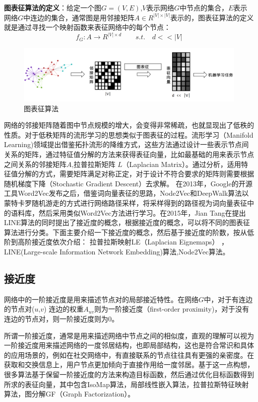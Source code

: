 \textbf{图表征算法的定义}：给定一个图$G = (V,E)$,$V$表示网络$G$中节点的集合，$E$表示网络$G$中连边的集合，通常图是用邻接矩阵$A \in R^{|V|\times|V|}$表示的，图表征算法的定义就是通过寻找一个映射函数来表征网络中的每个节点：
\begin{equation}
f_G: A \rightarrow R^{|V| \times d} \qquad s.t.\quad d<<|V|
\end{equation}

\begin{figure}
	\centering
	\includegraphics[width=5.5in]{figures/network_embedding}
	\caption{图表征算法}
\end{figure}


网络的邻接矩阵随着图中节点规模的增大，会变得非常稀疏，也就显现出了低秩的性质。对于低秩矩阵的流形学习的思想类似于图表征的过程。流形学习（Manifold Learning)领域提出借鉴拓扑流形的降维方式，这些方法通过设计一些表示节点间关系的矩阵，通过特征值分解的方法来获得表征向量，比如最基础的用来表示节点之间关系的邻接矩阵$A$,拉普拉斯矩阵 $L$（Laplacian Matrix）。通过分析，适用特征值分解的方式，需要矩阵满足对称正定，对于设计不符合要求的矩阵则需要根据随机梯度下降（Stochastic Gradient Descent）去求解。
在2013年，Google的开源工具Word2Vec\cite{mikolov2013efficient}发布之后，借鉴词向量表征的思路，Node2Vec和DeepWalk算法以蒙特卡罗随机游走的方式进行网络路径采样，将采样得到的路径视为词向量表征中的语料库，然后采用类似Word2Vec方法进行学习。在2015年，Jian Tang\cite{tang2015line}在提出LINE算法的同时提出了接近度的概念，根据接近度的概念，可以将不同的图表征算法进行分类。下面主要介绍一下接近度的概念，然后基于接近度的阶数，按从低阶到高阶接近度依次介绍：%
拉普拉斯映射LE（Laplacian Eignemaps） ， LINE(Large-scale Information Network Embedding)算法,Node2Vec算法。%
\subsection{接近度}
网络中的一阶接近度是用来描述节点对的局部接近特性。在网络$G$中，对于有连边的节点对($u$,$v$)
连边的权重$A_{uv}$则为一阶接近度（first-order proximity)，对于没有连边的节点对，则一阶接近度则为0。

所谓一阶接近度，通常是用来描述网络中节点之间的相似度，直观的理解可以视为一阶接近度用来描述网络的一度邻居结构，也即局部结构，这也是符合常识和具体的应用场景的，例如在社交网络中，有直接联系的节点往往具有更强的亲密度。在获取和交换信息上，用户节点更加倾向于直接作用给一度邻居。基于这一点构想，很多算法基于保留一阶接近度的方法来构造目标函数，然后通过优化目标函数得到所求的表征向量，其中包含IsoMap算法，局部线性嵌入算法，拉普拉斯特征映射算法，图分解GF\cite{ahmed2013distributed}（Graph Factorization）。

